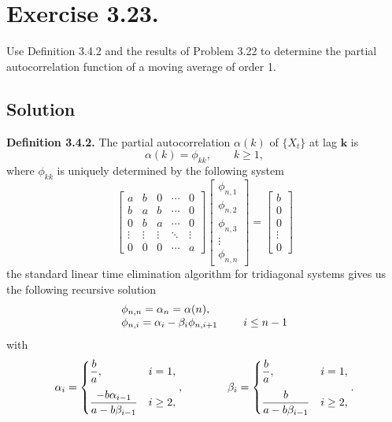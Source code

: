 \section*{Exercise 3.23.}

Use Definition 3.4.2 and the results of Problem 3.22 to determine the partial autocorrelation function of a moving average of order 1.

\subsection*{Solution}

\textbf{Definition 3.4.2.} The partial autocorrelation $\alpha( k )$ of $\{X_{t} \}$ at lag $\boldsymbol{k}$ is
\[  
\alpha( k )=\phi_{k k}, \qquad k \geq1,
\]
where $\phi_{k k}$ is uniquely determined by the following system
\[ \left[  \begin{matrix}
    a & b & 0 & \cdots & 0\\
    b & a & b & \cdots & 0\\
    0 & b & a & \cdots & 0\\
    \vdots & \vdots & \vdots & \ddots & \vdots\\
    0 & 0 & 0 & \cdots & a 
\end{matrix} \right] 
\left[ \begin{matrix}
    \phi_{n,1} \\ \phi_{n,2} \\ \phi_{n,3} \\ \vdots \\ \phi_{n,n}
\end{matrix} \right]
 = 
 \left[ \begin{matrix}
    b \\ 0 \\ 0 \\ \vdots \\ 0
\end{matrix} \right]
\]
the standard linear time elimination algorithm for tridiagonal systems gives us the following recursive solution
\[ \everymath{\displaystyle}
\arraycolsep=1.8pt\def\arraystretch{1}
\begin{array}{lr}
    \phi_{n,n} = \alpha_n = \alpha(n),\\
    \phi_{n,i} = \alpha_i - \beta_i \phi_{n,i+1} & \hspace{2em} i \leq n-1
\end{array}\]
with
\[ \everymath{\displaystyle}\arraycolsep=2.8pt\def\arraystretch{2.5}
    \alpha_i = 
    \begin{cases}
        \frac{b}{a}, & i = 1,\\[1em]
        \frac{- b \alpha_{i-1}}{a - b \beta_{i-1}}& i \geq 2,
    \end{cases} ,
    \hspace{4em}
    \beta_i = 
    \begin{cases}
        \frac{b}{a}, & i = 1,\\[1em]
        \frac{b}{a - b \beta_{i-1}}& i \geq 2,
    \end{cases} .
\]
